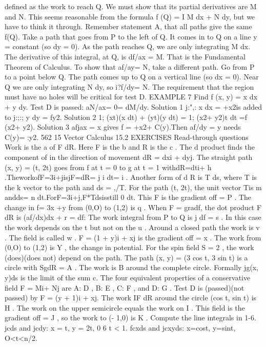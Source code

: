 defined as the work to reach Q. We must show that its partial derivatives are M and
N. This seems reasonable from the formula f (Q) = I M dx + N dy, but we have to
think it through.
Remember statement A, that all paths give the same f(Q). Take a path that goes
from P to the left of Q. It comes in to Q on a line y = constant (so dy = 0). As the
path reaches Q, we are only integrating M dx. The derivative of this integral, at Q, is
df/ax = M. That is the Fundamental Theorem of Calculus.
To show that af/ay= N, take a different path. Go from P to a point below Q. The
path comes up to Q on a vertical line (so dx = 0). Near Q we are only integrating
N dy, so i?f/dy= N.
The requirement that the region must have no holes will be critical for test D.
EXAMPLE 7 Find f (x, y) = x dx + y dy. Test D is passed: aN/ax= 0= dM/dy.
Solution 1 j:",: x dx = +x2is added to j:;:; y dy = fy2.
Solution 2 1; (xt)(x dt) + (yt)(y dt) = 1; (x2+ y2)t dt =f (x2+ y2).
Solution 3 afjax = x gives f = +x2+ C(y).Then af/dy = y needs C(y)= :y2. 
562 15 Vector Calculus
15.2 EXERCISES
Read-through questions
Work is the a of F dR. Here F is the b and R is
the c . The d product finds the component of
in the direction of movement dR = dxi + dyj. The straight
path (x, y) = (t, 2t) goes from f at t = 0 to g at t =
1 withdR=dti+ h .TheworkofF=3i+jisjF=dR=
j i dt= i .
Another form of d R is T ds, where T is the k vector to
the path and ds = ,/T. For the path (t, 2t), the unit vector
Tis m andds= n dt.ForF=3i+j,F*Tdsisstill
0 dt. This F is the gradient off = P . The change in
f= 3x +y from (0,O) to (1,2) is q .
When F = gradf, the dot product F dR is (af/dx)dx + r = df: The work integral from P to Q is j df = s . In this case the work depends on the t but not on the
u . Around a closed path the work is v . The field is
called w . F = (1 + y)i + xj is the gradient off = x .
The work from (0,O) to (1,2) is Y , the change in potential.
For the spin field S = 2 , the work (does)(does not)
depend on the path. The path (x, y) = (3 cos t, 3 sin t) is a
circle with SgdR = A . The work is B around the
complete circle. Formally jg(x, y)ds is the limit of the sum
c.
The four equivalent properties of a conservative field F =
Mi+ Nj are A: D , B: E , C: F , and D: G . Test D is (passed)(not passed) by F = (y + 1)i + xj. The work
IF dR around the circle (cos t, sin t) is H . The work on
the upper semicircle equals the work on I . This field is
the gradient off = J , so the work to (- 1,0) is K .
Compute the line integrals in 1-6.
jcds and jcdy: x = t, y = 2t, 0 6 t < 1.
fcxds and jcxyds: x=cost, y=sint, O<t<n/2.
